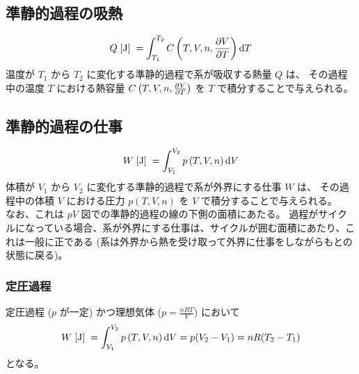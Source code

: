 \documentclass[a4paper,11pt]{jsarticle}
\newcommand{\braunit}[1]{\;\text{[}\unit[per-mode = symbol]{#1}\text{]}\;}
\begin{document}

\subsection{準静的過程の吸熱} \label{section:熱と仕事_準静的過程の吸熱}
\begin{align*}
  Q\braunit{\J} = \int_{T_1}^{T_2} C\left(T, V, n, \pdv{V}{T}\right)\dd{T}
\end{align*}
温度が $T_1$ から $T_2$ に変化する準静的過程で系が吸収する熱量 $Q$ は、
その過程中の温度 $T$ における熱容量 $C\left(T, V, n, \pdv{V}{T}\right)$ を $T$ で積分することで与えられる。
\cite[pp.44]{thermo}

\subsection{準静的過程の仕事} \label{section:熱と仕事_準静的過程の仕事}
\begin{align*}
  W\braunit{\J} = \int_{V_1}^{V_2} p\left(T, V, n\right)\dd{V}
\end{align*}
体積が $V_1$ から $V_2$ に変化する準静的過程で系が外界にする仕事 $W$ は、
その過程中の体積 $V$ における圧力 $p\left(T, V, n\right)$ を $V$ で積分することで与えられる。\\
なお、これは $pV$ 図での準静的過程の線の下側の面積にあたる。
過程がサイクルになっている場合、系が外界にする仕事は、サイクルが囲む面積にあたり、これは一般に正である
(系は外界から熱を受け取って外界に仕事をしながらもとの状態に戻る)。
\cite[pp.48]{thermo}
\subsubsection{定圧過程}
定圧過程 ($p$ が一定) かつ理想気体 ($p = \frac{nRT}{V}$) において
\begin{align*}
  W\braunit{\J} = \int_{V_1}^{V_2} p\left(T, V, n\right)\dd{V} = p(V_2 - V_1) = nR(T_2 - T_1)
\end{align*}
となる。
\cite[pp.48]{thermo}
\end{document}
